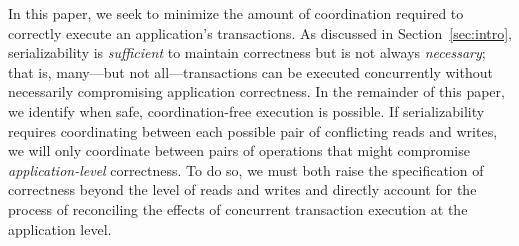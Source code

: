  In this paper, we seek to
minimize the amount of coordination required to correctly execute an
application's transactions. As discussed in Section~\ref{sec:intro},
serializability is \textit{sufficient} to maintain correctness but is
not always \textit{necessary}; that is, many---but not
all---transactions can be executed concurrently without necessarily
compromising application correctness. In the remainder of this paper,
we identify when safe, coordination-free execution is possible. If
serializability requires coordinating between each possible pair of
conflicting reads and writes, we will only coordinate between pairs of
operations that might compromise \textit{application-level}
correctness. To do so, we must both raise the specification of
correctness beyond the level of reads and writes and directly account
for the process of reconciling the effects of concurrent transaction
execution at the application level.


